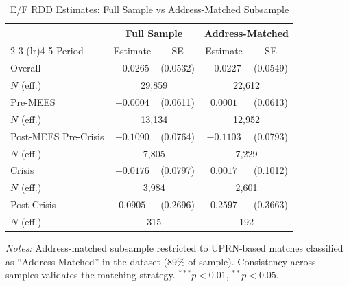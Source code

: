 \begin{table}[htbp]
\centering
\caption{E/F RDD Estimates: Full Sample vs Address-Matched Subsample}
\label{tab:match_validation}
\begin{tabular}{lcccc}
\toprule
 & \multicolumn{2}{c}{Full Sample} & \multicolumn{2}{c}{Address-Matched} \\
\cmidrule(lr){2-3} \cmidrule(lr){4-5}
Period & Estimate & SE & Estimate & SE \\
\midrule
Overall & $-0.0265$ & (0.0532) & $-0.0227$ & (0.0549) \\
\quad $N$ (eff.) & \multicolumn{2}{c}{29,859} & \multicolumn{2}{c}{22,612} \\
Pre-MEES & $-0.0004$ & (0.0611) & $0.0001$ & (0.0613) \\
\quad $N$ (eff.) & \multicolumn{2}{c}{13,134} & \multicolumn{2}{c}{12,952} \\
Post-MEES Pre-Crisis & $-0.1090$ & (0.0764) & $-0.1103$ & (0.0793) \\
\quad $N$ (eff.) & \multicolumn{2}{c}{7,805} & \multicolumn{2}{c}{7,229} \\
Crisis & $-0.0176$ & (0.0797) & $0.0017$ & (0.1012) \\
\quad $N$ (eff.) & \multicolumn{2}{c}{3,984} & \multicolumn{2}{c}{2,601} \\
Post-Crisis & $0.0905$ & (0.2696) & $0.2597$ & (0.3663) \\
\quad $N$ (eff.) & \multicolumn{2}{c}{315} & \multicolumn{2}{c}{192} \\
\bottomrule
\end{tabular}
\begin{minipage}{\textwidth}
\footnotesize
\textit{Notes:} Address-matched subsample restricted to UPRN-based matches classified as
``Address Matched'' in the \citet{chi2023linked} dataset (89\% of sample).
Consistency across samples validates the matching strategy.
$^{***}p<0.01$, $^{**}p<0.05$.
\end{minipage}
\end{table}
